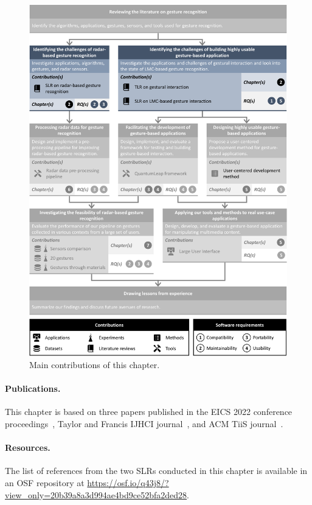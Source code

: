 \begin{figure}
    \centering
    \includegraphics[width=\linewidth]{Figures/StateOfTheArt/graphical-summary-state-of-the-art.pdf}
    \vspace{-18pt}
    \caption{Main contributions of this chapter.}
    \label{fig:state_of_the_art:graphical-summary}
\end{figure}

\paragraph{Publications.} This chapter is based on three papers published in the EICS 2022 conference proceedings~\cite{Sluyters:2022:EICS}, Taylor and Francis IJHCI journal~\cite{Sluyters:2022:LUI}, and ACM TiiS journal~\cite{Sluyters:2023}.

\paragraph{Resources.} The list of references from the two SLRs conducted in this chapter is available in an OSF repository at \url{https://osf.io/q43j8/?view_only=20b39a8a3d994ae4bd9ce52bfa2ded28}.

